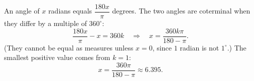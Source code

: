 An angle of $x$ radians equals $\dfrac{180x}{\pi}$ degrees. The two angles are coterminal when they differ by a multiple of $360^\circ$:
\[\dfrac{180x}{\pi}-x=360k\quad\Longrightarrow\quad x=\dfrac{360k\pi}{180-\pi}.\]
(They cannot be equal as measures unless $x=0$, since $1$ radian is not $1^\circ$.) The smallest positive value comes from $k=1$:
\[x=\boxed{\dfrac{360\pi}{180-\pi}}\approx6.395.\]
